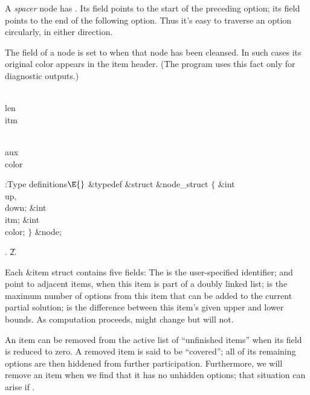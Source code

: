 A {\it spacer\/} node has . Its  field points
to the start
of the preceding option; its  field points to the end of the
following option.
Thus it's easy to traverse an option circularly, in either direction.

The  field of a node is set to  when that node has
been cleansed.
In such cases its original color appears in the item header.
(The program uses this fact only for diagnostic outputs.)

\Y\B\4\D\\{len}\5
\\{itm}\par
\B\4\D\\{aux}\5
\\{color}\par
\Y\B\4:Type definitions\X${}\E{}$\6
\&{typedef} \&{struct} \&{node\_struct} ${}\{{}$\1\6
\&{int} \\{up}${},{}$ \\{down};\6
\&{int} \\{itm};\6
\&{int} \\{color};\2\6
${}\}{}$ \&{node};\par
{}.
\U2.\fi

Each \&{item} struct contains five fields:
The  is the user-specified identifier;
 and  point to adjacent items, when this
item is part of a doubly linked list;
 is the maximum number of options from this item that can
be added to the current partial solution;
 is the difference between this item's given upper and lower
bounds.
As computation proceeds,  might change but  will
not.

An item can be removed from the active list of ``unfinished items'' when its
 field is reduced to zero. A removed item is said to be
``covered'';
all of its remaining options are then hiddened from further participation.
Furthermore, we will remove an item when we find that it has no unhidden
options; that situation can arise if .

